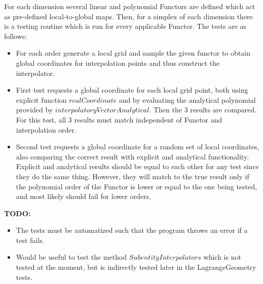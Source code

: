 \noindent
For each dimension several linear and polynomial Functors are defined which act as pre-defined local-to-global maps. Then, for a simplex of each dimension there is a testing routine which is run for every applicable Functor. The tests are as follows:
\begin{itemize}
	\item For each order generate a local grid and sample the given functor to obtain global coordinates for interpolation points and thus construct the interpolator.
	\item First test requests a global coordinate for each local grid point, both using explicit function $realCoordinate$ and by evaluating the analytical polynomial provided by $interpolatoryVectorAnalytical$. Then the 3 results are compared. For this test, all 3 results must match independent of Functor and interpolation order.
	\item Second test requests a global coordinate for a random set of local coordinates, also comparing the correct result with explicit and analytical functionality. Explicit and analytical results should be equal to each other for any test since they do the same thing. However, they will match to the true result only if the polynomial order of the Functor is lower or equal to the one being tested, and most likely should fail for lower orders.
\end{itemize}

\textbf{TODO:}
\begin{itemize}
	\item The tests must be automatized such that the program throws an error if a test fails.
	\item Would be useful to test the method $SubentityInterpolators$ which is not tested at the moment, but is indirectly tested later in the LagrangeGeometry tests.
\end{itemize}
